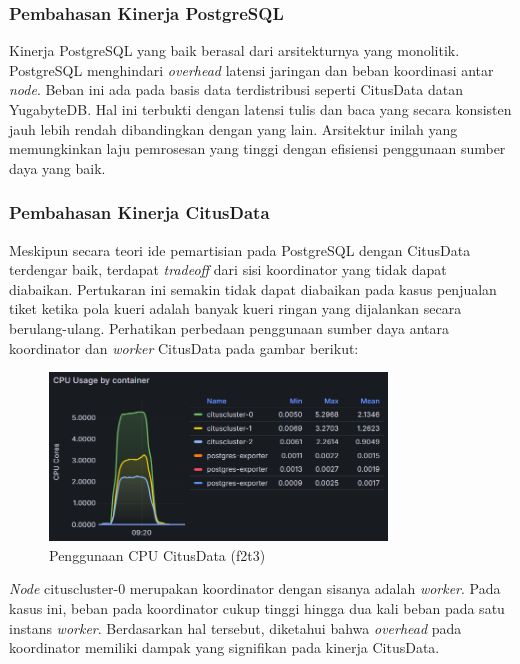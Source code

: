 \subsubsection{Pembahasan Kinerja PostgreSQL}

Kinerja PostgreSQL yang baik berasal dari arsitekturnya yang monolitik. PostgreSQL menghindari \textit{overhead} latensi jaringan dan beban koordinasi antar \textit{node}. Beban ini ada pada basis data terdistribusi seperti CitusData datan YugabyteDB. Hal ini terbukti dengan latensi tulis dan baca yang secara konsisten jauh lebih rendah dibandingkan dengan yang lain. Arsitektur inilah yang memungkinkan laju pemrosesan yang tinggi dengan efisiensi penggunaan sumber daya yang baik.

\subsubsection{Pembahasan Kinerja CitusData}

Meskipun secara teori ide pemartisian pada PostgreSQL dengan CitusData terdengar baik, terdapat \textit{tradeoff} dari sisi koordinator yang tidak dapat diabaikan. Pertukaran ini semakin tidak dapat diabaikan pada kasus penjualan tiket ketika pola kueri adalah banyak kueri ringan yang dijalankan secara berulang-ulang. Perhatikan perbedaan penggunaan sumber daya antara koordinator dan \textit{worker} CitusData pada gambar berikut:

\begin{figure}[htbp]
    \centering
    \includegraphics[width=0.8\textwidth]{resources/chapter-4/citusdata-usage.png}
    \caption{Penggunaan CPU CitusData (f2t3)}
    \label{fig:citusdata-usage}
\end{figure}

\textit{Node} cituscluster-0 merupakan koordinator dengan sisanya adalah \textit{worker}. Pada kasus ini, beban pada koordinator cukup tinggi hingga dua kali beban pada satu instans \textit{worker}. Berdasarkan hal tersebut, diketahui bahwa \textit{overhead} pada koordinator memiliki dampak yang signifikan pada kinerja CitusData.


